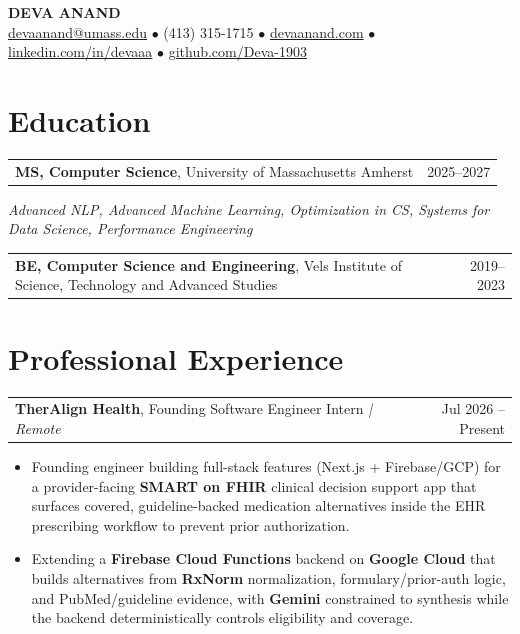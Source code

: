 \documentclass[letterpaper,11pt]{article}
\makeatletter
\newcommand{\eduItem}[3]{%
  \begin{tabular*}{\textwidth}{@{}l@{\extracolsep{\fill}}r@{}}
    \textbf{#1}, #2 & #3 \\
  \end{tabular*}\par
}
\newcommand{\expItem}[4]{%
  \vspace{2pt}
  \begin{tabular*}{\textwidth}{@{}l@{\extracolsep{\fill}}r@{}}
    \textbf{#1}, #2 \textit{| #3} & #4 \\
  \end{tabular*}\par\vspace{-3pt}
}
\makeatother
\begin{document}
\begin{center}
    {\fontsize{18}{20}\selectfont\bfseries DEVA ANAND}\\ \vspace{3pt}
    {\small
    \href{mailto:devaanand@umass.edu}{devaanand@umass.edu}
    \enspace$\bullet$\enspace
    (413) 315-1715
    \enspace$\bullet$\enspace
    \href{https://devaanand.com}{devaanand.com}
    \enspace$\bullet$\enspace
    \href{https://linkedin.com/in/devaaa/}{linkedin.com/in/devaaa}
    \enspace$\bullet$\enspace
    \href{https://github.com/Deva-1903}{github.com/Deva-1903}}
\end{center}
\vspace{-8pt}

\section{Education}
\eduItem{MS, Computer Science}{University of Massachusetts Amherst}{2025--2027}
{\small\textit{Advanced NLP, Advanced Machine Learning, Optimization in CS, Systems for Data Science, Performance Engineering}}\par
\vspace{3pt}
\eduItem{BE, Computer Science and Engineering}{Vels Institute of Science, Technology and Advanced Studies}{2019--2023}

\section{Professional Experience}

\expItem{TherAlign Health}{Founding Software Engineer Intern}{Remote}{Jul 2026 -- Present}
\begin{itemize}
  \item Founding engineer building full-stack features (Next.js + Firebase/GCP) for a provider-facing \textbf{SMART on FHIR} clinical decision support app that surfaces covered, guideline-backed medication alternatives inside the EHR prescribing workflow to prevent prior authorization.
  \item Extending a \textbf{Firebase Cloud Functions} backend on \textbf{Google Cloud} that builds alternatives from \textbf{RxNorm} normalization, formulary/prior-auth logic, and PubMed/guideline evidence, with \textbf{Gemini} constrained to synthesis while the backend deterministically controls eligibility and coverage.
\end{itemize}
\end{document}
